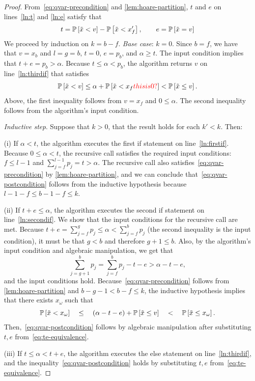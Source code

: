 \documentclass[10pt]{article} %
\newcommand{\gersi}[1]{\textcolor{red}{#1}}
\begin{document}
\begin{proof}
From~\eqref{eq:qvar-precondition} and \cref{lem:hoare-partition}, $t$ and $e$ on lines~\ref{ln:t} and \ref{ln:e} satisfy that
\begin{equation} \label{eq:te-equivalence}
  t = \P{\tilde{x} < v} - \P{\tilde{x} < x'_f}, \qquad e = \P{\tilde{x} = v}
\end{equation}
We proceed by induction on $k = b - f$. \emph{Base case}: $k = 0$. Since $b = f$, we have that $v = x_b$ and $l = g = b$, $t = 0$, $e = p_b$, and $\alpha  \ge t$. The input condition implies that $t + e = p_b > \alpha$. Because $t \le \alpha < p_b$, the algorithm returns $v$ on line~\ref{ln:thirdif} that satisfies
\[
  \P{\tilde{x} < v} \le \alpha + \P{\tilde{x} < x_f \gersi{this is 0?}} < \P{\tilde{x} \le v}. 
\]
Above, the first inequality follows from $v = x_f$ and $0 \le \alpha$. The second inequality follows from the algorithm's input condition.  

\emph{Inductive step}. Suppose that $k>0$, that the result holds for each $k' < k$. Then:

(i) If $\alpha < t$, the algorithm executes the first if statement on line~\ref{ln:firstif}. Because $0 \le \alpha  < t$, the recursive call satisfies the required input conditions: $f \le l-1$ and $\sum_{j=f}^{l-1} p_j = t > \alpha$. The recursive call also satisfies~\eqref{eq:qvar-precondition} by \cref{lem:hoare-partition}, and we can conclude that~\eqref{eq:qvar-postcondition} follows from the inductive hypothesis because $l-1 - f \le b-1 -f \le k$.

(ii) If $t + e \le \alpha$, the algorithm executes the second if statement on line~\ref{ln:secondif}. We show that the input conditions for the recursive call are met. Because $t + e = \sum_{j = f}^g p_j \le \alpha < \sum_{j=f}^b p_j$  (the second inequality is the input condition), it must be that $g < b$ and therefore $g+1 \le b$. Also, by the algorithm's input condition and algebraic manipulation, we get that
\[
 \sum_{j=g+1}^b p_j = \sum_{j=f}^b p_j - t - e > \alpha - t - e,
\]
and the input conditions hold.  Because~\eqref{eq:qvar-precondition} follows from \cref{lem:hoare-partition} and $b - g - 1 < b-f \le  k$, the inductive hypothesis implies that there exists $x_{\omega}$ such that
\[
  \P{\tilde{x} < x_{\omega}}
  \quad \le \quad
  (\alpha - t - e) + \P{\tilde{x} \le v}
  \quad < \quad \P{\tilde{x} \le x_{\omega}}. 
\]
Then,~\eqref{eq:qvar-postcondition} follows by algebraic manipulation after substituting $t,e$ from~\eqref{eq:te-equivalence}.

(iii) If $t \le \alpha < t + e$, the algorithm executes the else statement on line~\ref{ln:thirdif}, and the inequality~\eqref{eq:qvar-postcondition} holds by substituting $t,e$ from~\eqref{eq:te-equivalence}.
\end{proof}
\end{document}
